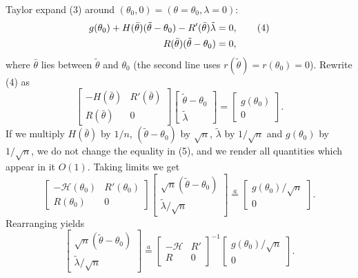 \documentclass[11pt]{article}
\begin{document}
Taylor expand (3) around $(\theta_{0},0)=(\theta=\theta_{0},\lambda=0)$:
\begin{align}
 g(\theta_{0})+H(\bar\theta)(\tilde\theta-\theta_{0})-R'(\bar\theta)\tilde\lambda&=0, \tag{4}\\
 R(\bar\theta)(\tilde\theta-\theta_{0})&=0, \notag
\end{align}
where $\bar\theta$ lies between $\tilde\theta$ and $\theta_{0}$ (the second line uses
$r(\tilde\theta)=r(\theta_{0})=0$). Rewrite (4) as
\begin{equation}\tag{5}
 \begin{bmatrix}-H(\bar\theta)&R'(\bar\theta)\\ R(\bar\theta)&0\end{bmatrix}
 \begin{bmatrix}\tilde\theta-\theta_{0}\\ \tilde\lambda\end{bmatrix}
 =\begin{bmatrix}g(\theta_{0})\\0\end{bmatrix}.
\end{equation}
If we multiply $H(\bar\theta)$ by $1/n$, $(\tilde\theta-\theta_{0})$ by $\sqrt n$, $\tilde\lambda$ by $1/\sqrt n$ and
$g(\theta_{0})$ by $1/\sqrt n$, we do not change the equality in (5), and we render all quantities
which appear in it $O(1)$. Taking limits we get
\begin{equation}\tag{6}
 \begin{bmatrix}-\mathcal H(\theta_{0})&R'(\theta_{0})\\ R(\theta_{0})&0\end{bmatrix}
 \begin{bmatrix}\sqrt n(\tilde\theta-\theta_{0})\\ \tilde\lambda/\sqrt n\end{bmatrix}
 \overset{a}{=}\begin{bmatrix}g(\theta_{0})/\sqrt n\\0\end{bmatrix}.
\end{equation}
Rearranging yields
\begin{equation}\tag{7}
 \begin{bmatrix}\sqrt n(\tilde\theta-\theta_{0})\\ \tilde\lambda/\sqrt n\end{bmatrix}
 \overset{a}{=}\begin{bmatrix}-\mathcal H&R'\\ R&0\end{bmatrix}^{-1}
 \begin{bmatrix}g(\theta_{0})/\sqrt n\\0\end{bmatrix}.
\end{equation}
\end{document}
